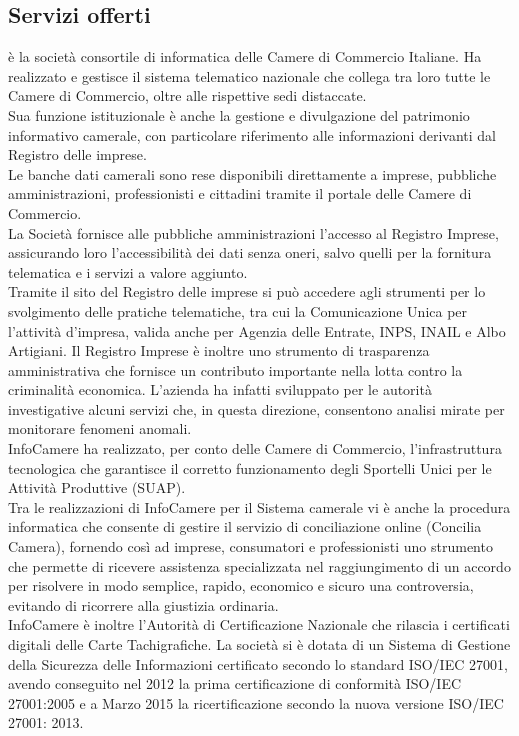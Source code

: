	\subsection{Servizi offerti}
	\nomeAzienda è la società consortile di informatica delle Camere di Commercio Italiane. Ha realizzato e gestisce il sistema telematico nazionale che collega tra loro tutte le Camere di Commercio, oltre alle rispettive sedi distaccate. \\
	Sua funzione istituzionale è anche la gestione e divulgazione del patrimonio informativo camerale, con particolare riferimento alle informazioni derivanti dal Registro delle imprese.\\
	Le banche dati camerali sono rese disponibili direttamente a imprese, pubbliche amministrazioni, professionisti e cittadini tramite il portale delle Camere di Commercio. \\
	La Società fornisce alle pubbliche amministrazioni l'accesso al Registro Imprese, assicurando loro l'accessibilità dei dati senza oneri, salvo quelli per la fornitura telematica e i servizi a valore aggiunto. \\
	Tramite il sito del Registro delle imprese si può accedere agli strumenti per lo svolgimento delle pratiche telematiche, tra cui la Comunicazione Unica per l'attività d'impresa, valida anche per Agenzia delle Entrate, INPS, INAIL e Albo Artigiani. Il Registro Imprese è inoltre uno strumento di trasparenza amministrativa che fornisce un contributo importante nella lotta contro la criminalità economica. L'azienda ha infatti sviluppato per le autorità investigative alcuni servizi che, in questa direzione, consentono analisi mirate per monitorare fenomeni anomali. \\
	InfoCamere ha realizzato, per conto delle Camere di Commercio, l'infrastruttura tecnologica che garantisce il corretto funzionamento degli Sportelli Unici per le Attività Produttive (SUAP). \\
	Tra le realizzazioni di InfoCamere per il Sistema camerale vi è anche la procedura informatica che consente di gestire il servizio di conciliazione online (Concilia Camera), fornendo così ad imprese, consumatori e professionisti uno strumento che permette di ricevere assistenza specializzata nel raggiungimento di un accordo per risolvere in modo semplice, rapido, economico e sicuro una controversia, evitando di ricorrere alla giustizia ordinaria. \\
	InfoCamere è inoltre l'Autorità di Certificazione Nazionale che rilascia i certificati digitali delle Carte Tachigrafiche.
	La società si è dotata di un Sistema di Gestione della Sicurezza delle Informazioni certificato secondo lo standard ISO/IEC 27001, avendo conseguito nel 2012 la prima certificazione di conformità ISO/IEC 27001:2005 e a Marzo 2015 la ricertificazione secondo la nuova versione ISO/IEC 27001: 2013.

